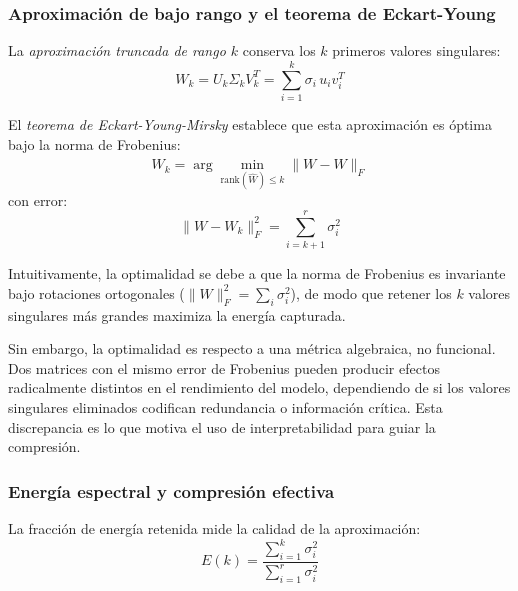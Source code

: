 \subsubsection{Aproximación de bajo rango y el teorema de Eckart-Young}
\label{sec:sota-eckart-young}

La \emph{aproximación truncada de rango $k$} conserva los $k$ primeros valores
singulares:
\begin{equation}
    W_k = U_k \Sigma_k V_k^T = \sum_{i=1}^{k} \sigma_i\, u_i v_i^T
    \label{eq:svd-truncada-teoria}
\end{equation}

El \emph{teorema de Eckart-Young-Mirsky} \cite{eckart1936approximation} establece
que esta aproximación es óptima bajo la norma de Frobenius:
\begin{equation}
    W_k = \arg\min_{\text{rank}(\hat{W}) \leq k} \| W - \hat{W} \|_F
    \label{eq:eckart-young}
\end{equation}
con error:
\begin{equation}
    \| W - W_k \|_F^2 = \sum_{i=k+1}^{r} \sigma_i^2
    \label{eq:error-svd}
\end{equation}

Intuitivamente, la optimalidad se debe a que la norma de Frobenius es invariante
bajo rotaciones ortogonales ($\|W\|_F^2 = \sum_i \sigma_i^2$), de modo que retener
los $k$ valores singulares más grandes maximiza la energía capturada.

Sin embargo, la optimalidad es respecto a una métrica algebraica, no funcional. Dos
matrices con el mismo error de Frobenius pueden producir efectos radicalmente
distintos en el rendimiento del modelo, dependiendo de si los valores singulares
eliminados codifican redundancia o información crítica. Esta discrepancia es lo que
motiva el uso de interpretabilidad para guiar la compresión.

\subsubsection{Energía espectral y compresión efectiva}
\label{sec:sota-energia-espectral}

La fracción de energía retenida mide la calidad de la aproximación:
\begin{equation}
    E(k) = \frac{\sum_{i=1}^{k} \sigma_i^2}{\sum_{i=1}^{r} \sigma_i^2}
    \label{eq:energia}
\end{equation}

